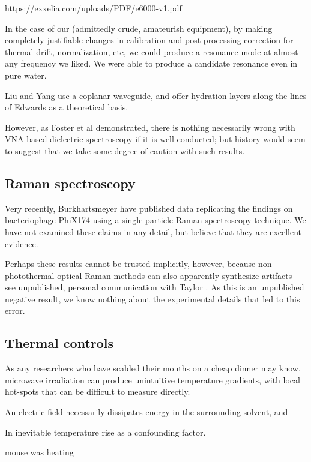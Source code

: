 \documentclass[paper.tex]{subfiles}
\begin{document}
\begin{multicols}{1}
https://exxelia.com/uploads/PDF/e6000-v1.pdf


In the case of our (admittedly crude, amateurish equipment), by making completely justifiable changes in calibration and post-processing correction for thermal drift, normalization, etc, we could produce a resonance mode at almost any frequency we liked. We were able to produce a candidate resonance even in pure water.


Liu and Yang use a coplanar waveguide, and offer hydration layers along the lines of Edwards as a theoretical basis.




However, as Foster et al demonstrated, there is nothing necessarily wrong with VNA-based dielectric spectroscopy if it is well conducted; but history would seem to suggest that we take some degree of caution with such results.


\subsection{Raman spectroscopy}

Very recently, Burkhartsmeyer \cite{Optical2020} have published data replicating the findings on bacteriophage PhiX174 using a single-particle Raman spectroscopy technique. We have not examined these claims in any detail, but believe that they are excellent evidence.

Perhaps these results cannot be trusted implicitly, however, because non-photothermal optical Raman methods can also apparently synthesize artifacts - see unpublished, personal communication with Taylor \cite{mechanisms1981}. As this is an unpublished negative result, we know nothing about the experimental details that led to this error.

\subsection{Thermal controls}

As any researchers who have scalded their mouths on a cheap dinner may know, microwave irradiation can produce unintuitive temperature gradients, with local hot-spots that can be difficult to measure directly.

An electric field necessarily dissipates energy in the surrounding solvent, and 

In inevitable temperature rise as a confounding factor. 

mouse was heating


\end{multicols}
\end{document}
